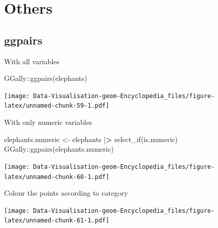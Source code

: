 \documentclass[
]{book}
\newenvironment{Shaded}{\begin{snugshade}}{\end{snugshade}}
\newcommand{\AttributeTok}[1]{\textcolor[rgb]{0.77,0.63,0.00}{#1}}
\newcommand{\ErrorTok}[1]{\textcolor[rgb]{0.64,0.00,0.00}{\textbf{#1}}}
\newcommand{\FunctionTok}[1]{\textcolor[rgb]{0.00,0.00,0.00}{#1}}
\newcommand{\NormalTok}[1]{#1}
\newcommand{\OtherTok}[1]{\textcolor[rgb]{0.56,0.35,0.01}{#1}}
\newcommand{\SpecialCharTok}[1]{\textcolor[rgb]{0.00,0.00,0.00}{#1}}
\begin{document}
\hypertarget{others}{%
\chapter{Others}\label{others}}

\hypertarget{ggpairs}{%
\section{ggpairs}\label{ggpairs}}

With all variables

\begin{Shaded}
\begin{Highlighting}[]
\NormalTok{GGally}\SpecialCharTok{::}\FunctionTok{ggpairs}\NormalTok{(elephants)}
\end{Highlighting}
\end{Shaded}

\texttt{[image: Data-Visualisation-geom-Encyclopedia\_files/figure-latex/unnamed-chunk-59-1.pdf]}

With only numeric variables

\begin{Shaded}
\begin{Highlighting}[]
\NormalTok{elephants.numeric }\OtherTok{\textless{}{-}}\NormalTok{ elephants }\SpecialCharTok{|}\ErrorTok{\textgreater{}} \FunctionTok{select\_if}\NormalTok{(is.numeric)     }
\NormalTok{GGally}\SpecialCharTok{::}\FunctionTok{ggpairs}\NormalTok{(elephants.numeric)}
\end{Highlighting}
\end{Shaded}

\texttt{[image: Data-Visualisation-geom-Encyclopedia\_files/figure-latex/unnamed-chunk-60-1.pdf]}

Colour the points according to category

\begin{Shaded}
\end{Shaded}

\texttt{[image: Data-Visualisation-geom-Encyclopedia\_files/figure-latex/unnamed-chunk-61-1.pdf]}

\printbibliography
\end{document}
